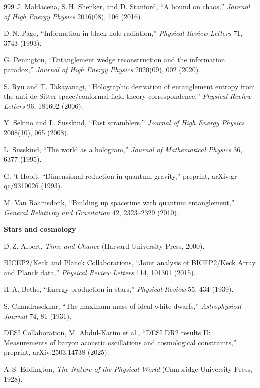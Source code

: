 \begin{thebibliography}{999}
 J. Maldacena, S.\,H. Shenker, and D. Stanford, ``A bound on chaos,'' \textit{Journal of High Energy Physics} 2016(08), 106 (2016).

 D.\,N. Page, ``Information in black hole radiation,'' \textit{Physical Review Letters} 71, 3743 (1993).

 G. Penington, ``Entanglement wedge reconstruction and the information paradox,'' \textit{Journal of High Energy Physics} 2020(09), 002 (2020).

 S. Ryu and T. Takayanagi, ``Holographic derivation of entanglement entropy from the anti-de Sitter space/conformal field theory correspondence,'' \textit{Physical Review Letters} 96, 181602 (2006).

 Y. Sekino and L. Susskind, ``Fast scramblers,'' \textit{Journal of High Energy Physics} 2008(10), 065 (2008).

 L. Susskind, ``The world as a hologram,'' \textit{Journal of Mathematical Physics} 36, 6377 (1995).

 G. 't Hooft, ``Dimensional reduction in quantum gravity,'' preprint, arXiv:gr-qc/9310026 (1993).

 M. Van Raamsdonk, ``Building up spacetime with quantum entanglement,'' \textit{General Relativity and Gravitation} 42, 2323--2329 (2010).

\item[] \textbf{Stars and cosmology}

 D.\,Z. Albert, \textit{Time and Chance} (Harvard University Press, 2000).

 BICEP2/Keck and Planck Collaborations, ``Joint analysis of BICEP2/Keck Array and Planck data,'' \textit{Physical Review Letters} 114, 101301 (2015).

 H.\,A. Bethe, ``Energy production in stars,'' \textit{Physical Review} 55, 434 (1939).

 S. Chandrasekhar, ``The maximum mass of ideal white dwarfs,'' \textit{Astrophysical Journal} 74, 81 (1931).

 DESI Collaboration, M. Abdul-Karim et al., ``DESI DR2 results II: Measurements of baryon acoustic oscillations and cosmological constraints,'' preprint, arXiv:2503.14738 (2025).

 A.\,S. Eddington, \textit{The Nature of the Physical World} (Cambridge University Press, 1928).


\end{thebibliography}
